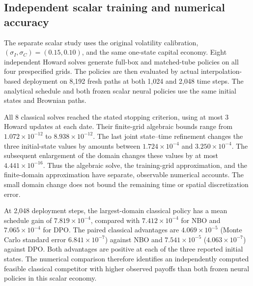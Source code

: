 \subsection{Independent scalar training and numerical accuracy}

\label{sec:r15scalarresults}

The separate scalar study uses the original volatility calibration, $(\sigma_I,\sigma_C)=(0.15,0.10)$, and the same one-state capital economy. Eight independent Howard solves generate full-box and matched-tube policies on all four prespecified grids. The policies are then evaluated by actual interpolation-based deployment on 8,192 fresh paths at both 1,024 and 2,048 time steps. The analytical schedule and both frozen scalar neural policies use the same initial states and Brownian paths.



All 8 classical solves reached the stated stopping criterion, using at most 3 Howard updates at each date. Their finite-grid algebraic bounds range from $1.072\times10^{-12}$ to $8.938\times10^{-12}$. The last joint state--time refinement changes the three initial-state values by amounts between $1.724\times10^{-4}$ and $3.250\times10^{-4}$. The subsequent enlargement of the domain changes these values by at most $4.441\times10^{-16}$. Thus the algebraic solve, the training-grid approximation, and the finite-domain approximation have separate, observable numerical accounts. The small domain change does not bound the remaining time or spatial discretization error.



At 2,048 deployment steps, the largest-domain classical policy has a mean schedule gain of $7.819\times10^{-4}$, compared with $7.412\times10^{-4}$ for NBO and $7.065\times10^{-4}$ for DPO. The paired classical advantages are $4.069\times10^{-5}$ (Monte Carlo standard error $6.841\times10^{-7}$) against NBO and $7.541\times10^{-5}$ ($4.063\times10^{-7}$) against DPO. Both advantages are positive at each of the three reported initial states. The numerical comparison therefore identifies an independently computed feasible classical competitor with higher observed payoffs than both frozen neural policies in this scalar economy.

